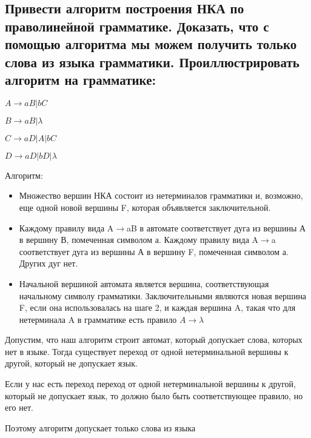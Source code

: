 \documentclass[a4paper,12pt]{article}
\begin{document}
\subsection{ Привести алгоритм построения НКА по праволинейной грамматике. Доказать, что с помощью алгоритма мы можем получить только слова из языка грамматики. Проиллюстрировать алгоритм на грамматике:}
\begin{center}
    $A \rightarrow aB|bC$
    
    $B \rightarrow aB|\lambda$

    $C \rightarrow aD|A|bC$

    $D \rightarrow aD|bD|\lambda$
\end{center}

{Алгоритм: }
\begin{itemize}
 \item {
    Множество   вершин   НКА   состоит   из   нетерминалов грамматики  и,  возможно, еще  одной  новой  вершины F, которая объявляется заключительной.
 }
 \item {
    Каждому  правилу  вида  A$\rightarrow$aB  в  автомате  соответствует дуга  из  вершины А в  вершину В,  помеченная  символом а.  Каждому  правилу  вида  A$\rightarrow$a  соответствует  дуга из  вершины А в  вершину F,  помеченная  символом а. Других дуг нет.
 }
 
 \item {
 Начальной вершиной   автомата   является   вершина, соответствующая    начальному    символу    грамматики. Заключительными    являются новая вершина F, если  она использовалась на шаге 2, и каждая вершина A, такая что для нетерминала A в грамматике есть правило  $A \rightarrow \lambda$
 }
 
\end{itemize}

{Допустим, что наш алгоритм строит автомат, который допускает слова, которых нет в языке. Тогда существует переход от одной нетерминальной вершины к другой, который не допускает язык.
  
  Если у нас есть переход переход от одной нетерминальной вершины к другой, который не допускает язык, то должно было быть соответствующее правило, но его нет.
  
  Поэтому алгоритм допускает только слова из языка}
  
    
\end{document}
